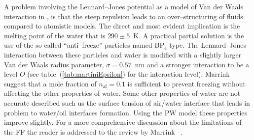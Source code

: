 A problem involving the Lennard--Jones potential as a model of Van der Waals interaction in \martini, is that the steep repulsion leads to an over--structuring of fluids compared to atomistic models. The direct and most evident implication is the melting point of the water that is $290 \pm 5$~K. A practical partial solution is the use of the so called ``anti--freeze'' particles named BP$_4$ type. The Lennard--Jones interaction between these particles and water is modified with a slightly larger Van der Waals radius parameter, $\sigma = 0.57$~nm and a stronger interaction to be a level $O$ (see table~(\ref{tab:martiniEpsilon}) for the interaction level). Marrink \etal\, suggest that a mole fraction of $n_{\text{af}} = 0.1$ is sufficient to prevent freezing without affecting the other properties of water. Some other properties of water are not accurate described such us the surface tension of air/water interface that leads in problem to water/oil interfaces formation. Using the \ac{PW} model these properties improve slightly. For a more comprehensive discussion about the limitations of the \martini \ac{FF} the reader is addressed to the review by Marrink \etal\, \cite{MartiniReview}.

